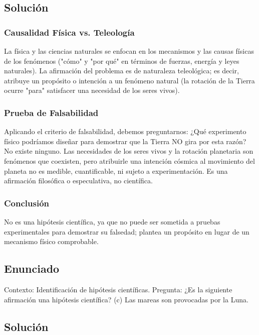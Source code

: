\documentclass[12pt,letterpaper]{article}
\begin{document}
\subsection*{Solución}

\subsubsection*{Causalidad Física vs. Teleología}
La física y las ciencias naturales se enfocan en los mecanismos y las causas físicas de los fenómenos ("cómo" y "por qué" en términos de fuerzas, energía y leyes naturales). La afirmación del problema es de naturaleza teleológica; es decir, atribuye un propósito o intención a un fenómeno natural (la rotación de la Tierra ocurre "para" satisfacer una necesidad de los seres vivos).

\subsubsection*{Prueba de Falsabilidad}
Aplicando el criterio de falsabilidad, debemos preguntarnos: ¿Qué experimento físico podríamos diseñar para demostrar que la Tierra NO gira por esta razón? No existe ninguno. Las necesidades de los seres vivos y la rotación planetaria son fenómenos que coexisten, pero atribuirle una intención cósmica al movimiento del planeta no es medible, cuantificable, ni sujeto a experimentación. Es una afirmación filosófica o especulativa, no científica.

\subsubsection*{Conclusión}
No es una hipótesis científica, ya que no puede ser sometida a pruebas experimentales para demostrar su falsedad; plantea un propósito en lugar de un mecanismo físico comprobable.

\newpage

\subsection*{Enunciado}
Contexto: Identificación de hipótesis científicas.
Pregunta: ¿Es la siguiente afirmación una hipótesis científica? (c) Las mareas son provocadas por la Luna.

\subsection*{Solución}
\end{document}
